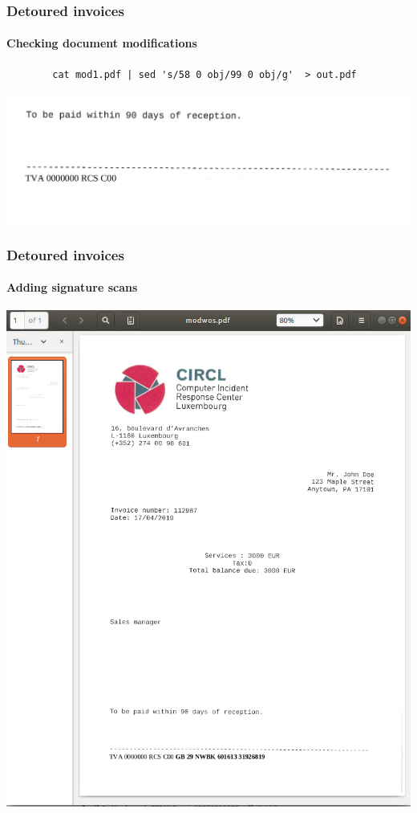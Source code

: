 \begin{frame}[fragile]
    \frametitle{Detoured invoices}
    \framesubtitle{Checking document modifications}
    \begin{lstlisting}
        cat mod1.pdf | sed 's/58 0 obj/99 0 obj/g'  > out.pdf
    \end{lstlisting}
    \begin{center}
        \includegraphics[scale=0.20]{account.png}
    \end{center}
\end{frame}

\begin{frame}
    \frametitle{Detoured invoices}
    \framesubtitle{Adding signature scans}
    \begin{center}
        \includegraphics[scale=0.15]{wos.png}
    \end{center}
\end{frame}

